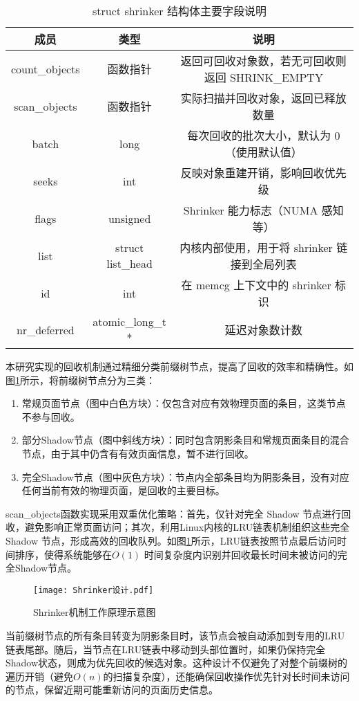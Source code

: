\begin{table}[htbp]
  \centering
  \caption{struct shrinker 结构体主要字段说明}
  \label{tab:shrinker_struct}
  \begin{tabular}{ccc}
    \toprule
    \textbf{成员} & \textbf{类型} & \textbf{说明} \\
    \midrule
    count\_objects & 函数指针 & 返回可回收对象数，若无可回收则返回 SHRINK\_EMPTY \\
    scan\_objects & 函数指针 & 实际扫描并回收对象，返回已释放数量 \\
    batch & long & 每次回收的批次大小，默认为 0（使用默认值） \\
    seeks & int & 反映对象重建开销，影响回收优先级 \\
    flags & unsigned & Shrinker 能力标志（NUMA 感知等） \\
    list & struct list\_head & 内核内部使用，用于将 shrinker 链接到全局列表 \\
    id & int & 在 memcg 上下文中的 shrinker 标识 \\
    nr\_deferred & atomic\_long\_t * & 延迟对象数计数 \\
    \bottomrule
  \end{tabular}
\end{table}

本研究实现的回收机制通过精细分类前缀树节点，提高了回收的效率和精确性。如图\ref{fig:shrink}所示，将前缀树节点分为三类：


\begin{enumerate}
  \item 常规页面节点（图中白色方块）：仅包含对应有效物理页面的条目，这类节点不参与回收。
  \item 部分Shadow节点（图中斜线方块）：同时包含阴影条目和常规页面条目的混合节点，由于其中仍含有有效页面信息，暂不进行回收。
  \item 完全Shadow节点（图中灰色方块）：节点内全部条目均为阴影条目，没有对应任何当前有效的物理页面，是回收的主要目标。
\end{enumerate}
scan\_objects函数实现采用双重优化策略：首先，仅针对完全 Shadow 节点进行回收，避免影响正常页面访问；其次，利用Linux内核的LRU链表机制组织这些完全 Shadow 节点，形成高效的回收队列。如图\ref{fig:shrink}所示，LRU链表按照节点最后访问时间排序，使得系统能够在\( O(1) \) 时间复杂度内识别并回收最长时间未被访问的完全Shadow节点。
\begin{figure}[htbp]
  \centering
  \texttt{[image: Shrinker设计.pdf]}
  \caption{Shrinker机制工作原理示意图}
  \label{fig:shrink}
\end{figure}
当前缀树节点的所有条目转变为阴影条目时，该节点会被自动添加到专用的LRU链表尾部。随后，当节点在LRU链表中移动到头部位置时，如果仍保持完全Shadow状态，则成为优先回收的候选对象。这种设计不仅避免了对整个前缀树的遍历开销（避免\(O(n)\)的扫描复杂度），还能确保回收操作优先针对长时间未访问的节点，保留近期可能重新访问的页面历史信息。

